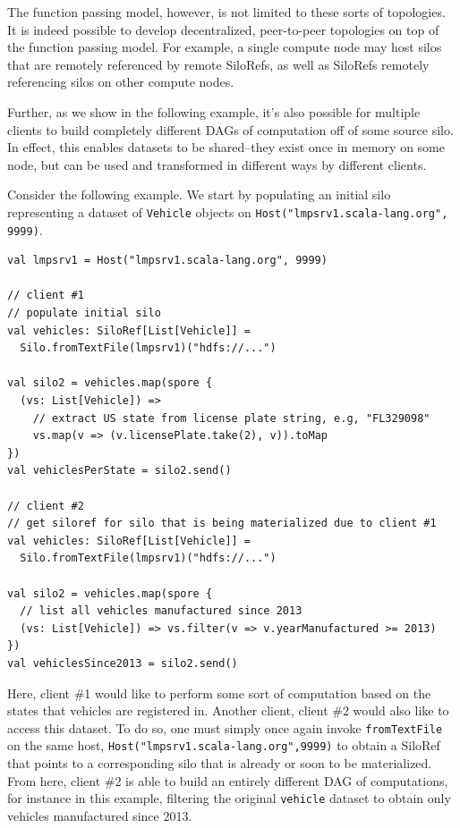 \documentclass[preprint]{sigplanconf}
\theoremstyle{definition}
\theoremstyle{definition}
\begin{document}
The function passing model, however, is not limited to these sorts of
topologies. It is indeed possible to develop decentralized, peer-to-peer
topologies on top of the function passing model. For example, a single compute
node may host silos that are remotely referenced by remote SiloRefs, as well as
SiloRefs remotely referencing silos on other compute nodes.

Further, as we show in the following example, it's also possible for multiple
clients to build completely different DAGs of computation off of some source
silo. In effect, this enables datasets to be shared--they exist once in memory
on some node, but can be used and transformed in different ways by different
clients.

Consider the following example. We start by populating an initial silo
representing a dataset of \verb|Vehicle| objects on
\verb|Host("lmpsrv1.scala-lang.org", 9999)|.

\begin{lstlisting}
val lmpsrv1 = Host("lmpsrv1.scala-lang.org", 9999)

// client #1
// populate initial silo
val vehicles: SiloRef[List[Vehicle]] =
  Silo.fromTextFile(lmpsrv1)("hdfs://...")

val silo2 = vehicles.map(spore {
  (vs: List[Vehicle]) =>
    // extract US state from license plate string, e.g, "FL329098"
    vs.map(v => (v.licensePlate.take(2), v)).toMap
})
val vehiclesPerState = silo2.send()

// client #2
// get siloref for silo that is being materialized due to client #1
val vehicles: SiloRef[List[Vehicle]] =
  Silo.fromTextFile(lmpsrv1)("hdfs://...")

val silo2 = vehicles.map(spore {
  // list all vehicles manufactured since 2013
  (vs: List[Vehicle]) => vs.filter(v => v.yearManufactured >= 2013)
})
val vehiclesSince2013 = silo2.send()
\end{lstlisting}

Here, client \#1 would like to perform some sort of computation based on the
states that vehicles are registered in. Another client, client \#2 would also
like to access this dataset. To do so, one must simply once again invoke
\verb|fromTextFile| on the same host, \verb|Host("lmpsrv1.scala-lang.org",9999)|
to obtain a SiloRef that points to a corresponding silo that is already or
soon to be materialized. From here, client \#2 is able to build an entirely
different DAG of computations, for instance in this example, filtering the
original \verb|vehicle| dataset to obtain only vehicles manufactured
since 2013.
\end{document}
